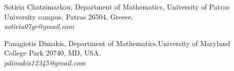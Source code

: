 \documentclass[12pt,oneside,reqno]{amsart}
\newtheorem{lemma}[theorem]{Lemma}
\theoremstyle{definition}
\numberwithin{equation}{section}
\numberwithin{theorem}{section}
\begin{document}






 











\vspace{12pt}
\noindent
Sotiria Chatzimarkou, Department of Mathematics, University of Patras\\
University campus, Patras 26504, Greece.\\
\textit{sotiria07gr@gmail.com}

\vspace{7pt}
\noindent
Panagiotis Dimakis, Department of Mathematics,University of Maryland\\
College Park 20740, MD, USA.\\
\textit{pdimakis12345@gmail.com}
\end{document}
